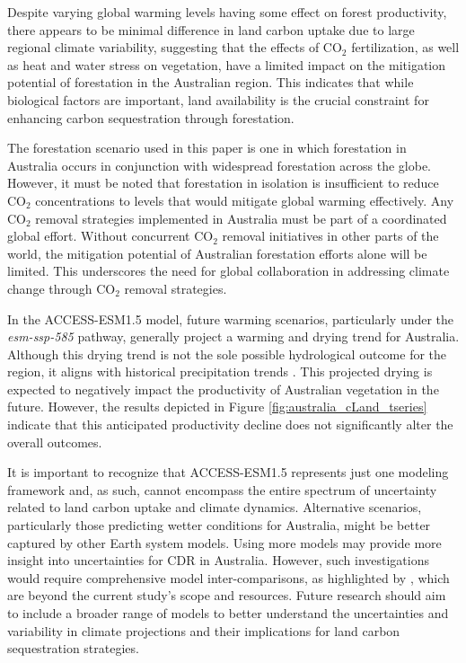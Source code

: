 \documentclass[]{article}
\begin{document}
Despite varying global warming levels having some effect on forest productivity, there appears to be minimal difference in land carbon uptake due to large regional climate variability, suggesting that the effects of CO$_2$ fertilization, as well as heat and water stress on vegetation, have a limited impact on the mitigation potential of forestation in the Australian region.
This indicates that while biological factors are important, land availability is the crucial constraint for enhancing carbon sequestration through forestation.

The forestation scenario used in this paper is one in which forestation in Australia occurs in conjunction with widespread forestation across the globe.
However, it must be noted that forestation in isolation is insufficient to reduce CO$_2$ concentrations to levels that would mitigate global warming effectively.
Any CO$_2$ removal strategies implemented in Australia must be part of a coordinated global effort.
Without concurrent CO$_2$ removal initiatives in other parts of the world, the mitigation potential of Australian forestation efforts alone will be limited.
This underscores the need for global collaboration in addressing climate change through CO$_2$ removal strategies.

In the ACCESS-ESM1.5 model, future warming scenarios, particularly under the \textit{esm-ssp-585} pathway, generally project a warming and drying trend for Australia.
Although this drying trend is not the sole possible hydrological outcome for the region, it aligns with historical precipitation trends \parencite{ziehn_australian_2020}.
This projected drying is expected to negatively impact the productivity of Australian vegetation in the future.
However, the results depicted in Figure \ref{fig:australia_cLand_tseries} indicate that this anticipated productivity decline does not significantly alter the overall outcomes.

It is important to recognize that ACCESS-ESM1.5 represents just one modeling framework and, as such, cannot encompass the entire spectrum of uncertainty related to land carbon uptake and climate dynamics.
Alternative scenarios, particularly those predicting wetter conditions for Australia, might be better captured by other Earth system models.
Using more models may provide more insight into uncertainties for CDR in Australia.
However, such investigations would require comprehensive model inter-comparisons, as highlighted by \textcite{loughran_limited_2023}, which are beyond the current study's scope and resources.
Future research should aim to include a broader range of models to better understand the uncertainties and variability in climate projections and their implications for land carbon sequestration strategies.
\end{document}
